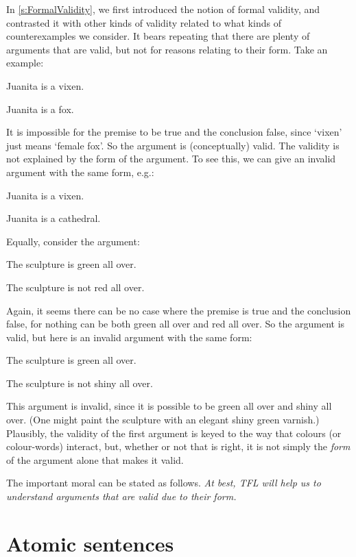 In \cref{s:FormalValidity}, we first introduced the notion of formal
validity, and contrasted it with other kinds of validity related to
what kinds of counterexamples we consider. It bears repeating that
there are plenty of arguments that are valid, but not for reasons
relating to their form. Take an example:
	\begin{earg}
		\item[] Juanita is a vixen.
		\item[\texttherefore] Juanita is a fox.
	\end{earg}
It is impossible for the premise to be true and the conclusion false,
since `vixen' just means `female fox'. So the argument is
(conceptually) valid. The validity is not explained by the form of the
argument. To see this, we can give an invalid argument with the same
form, e.g.:
	\begin{earg}
		\item[] Juanita is a vixen.
		\item[\texttherefore] Juanita is a cathedral.
	\end{earg}
Equally, consider the argument:
	\begin{earg}
		\item[] The sculpture is green all over.
		\item[\texttherefore] The sculpture is not red all over.
	\end{earg}
Again, it seems there can be no case where the premise is true and the
conclusion false, for nothing can be both green all over and red all
over. So the argument is valid, but here is an invalid argument with
the same form:
	\begin{earg}
		\item[] The sculpture is green all over.
		\item[\texttherefore] The sculpture is not shiny all over.
	\end{earg}
This argument is invalid, since it is possible to be green all over
and shiny all over. (One might paint the sculpture with an elegant
shiny green varnish.) Plausibly, the validity of the first argument is
keyed to the way that colours (or colour-words) interact, but, whether
or not that is right, it is not simply the \emph{form} of the
argument alone that makes it valid.

The important moral can be stated as follows. \emph{At best, TFL will help us to understand arguments that are valid due to their form.}

\section{Atomic sentences}

